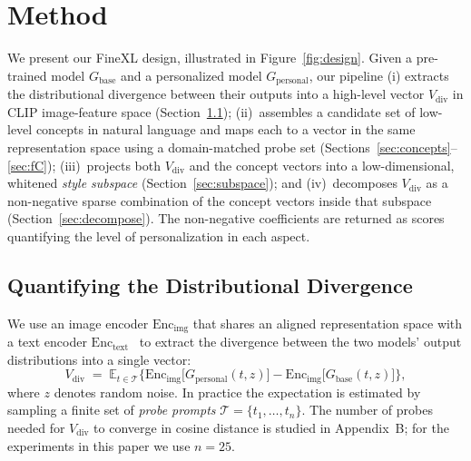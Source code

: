%
%

\section{Method}
\label{sec:method}

We present our FineXL design, illustrated in Figure~\ref{fig:design}. Given a
pre-trained model $G_{\mathrm{base}}$ and a personalized model
$G_{\mathrm{personal}}$, our pipeline (i) extracts the distributional
divergence between their outputs into a high-level vector
$V_{\mathrm{div}}$ in CLIP image-feature space (Section~\ref{sec:vdiv});
(ii)~assembles a candidate set of low-level concepts in natural language and
maps each to a vector in the same representation space using a domain-matched
probe set (Sections~\ref{sec:concepts}--\ref{sec:fC}); (iii)~projects both
$V_{\mathrm{div}}$ and the concept vectors into a low-dimensional, whitened
\emph{style subspace} (Section~\ref{sec:subspace}); and (iv)~decomposes
$V_{\mathrm{div}}$ as a non-negative sparse combination of the concept vectors
inside that subspace (Section~\ref{sec:decompose}). The non-negative
coefficients are returned as scores quantifying the level of personalization
in each aspect.

\subsection{Quantifying the Distributional Divergence}
\label{sec:vdiv}

We use an image encoder $\mathrm{Enc}_{\mathrm{img}}$ that shares an aligned
representation space with a text encoder
$\mathrm{Enc}_{\mathrm{text}}$~\cite{clip} to extract the divergence between
the two models' output distributions into a single vector:
\begin{equation}
\label{eq:vdiv}
V_{\mathrm{div}} \;=\; \mathbb{E}_{t \in \mathcal{T}}
\bigl\{
  \mathrm{Enc}_{\mathrm{img}}\!\bigl[G_{\mathrm{personal}}(t,z)\bigr]
  -
  \mathrm{Enc}_{\mathrm{img}}\!\bigl[G_{\mathrm{base}}(t,z)\bigr]
\bigr\},
\end{equation}
where $z$ denotes random noise. In practice the expectation is estimated by
sampling a finite set of \emph{probe prompts}
$\mathcal{T}=\{t_1,\dots,t_n\}$. The number of probes needed for $V_{\mathrm{div}}$ to
converge in cosine distance is studied in Appendix~B; for the experiments in
this paper we use $n{=}25$.

